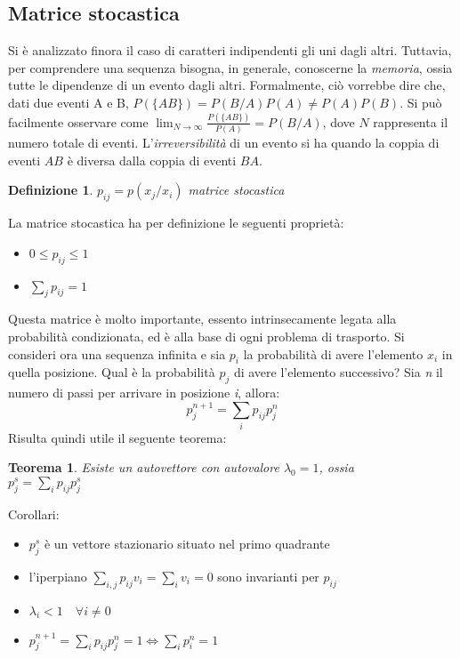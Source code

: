 \documentclass[12pt, a4paper]{book}
\theoremstyle{theorem}
\newtheorem{definition}{Definizione}[section]
\newtheorem{theorem}{Teorema}[section]
\begin{document}
			\subsection{Matrice stocastica}
				Si è analizzato finora il caso di caratteri indipendenti gli uni dagli altri.
				Tuttavia, per comprendere una sequenza bisogna, in generale, conoscerne la \textit{memoria}, ossia tutte le dipendenze di un evento dagli altri.
				Formalmente, ciò vorrebbe dire che, dati due eventi A e B, $P\left(\{AB\}\right)=P\left(B/A\right)P(A)\neq P(A)P(B)$.
				Si può facilmente osservare come $\lim_{N\to\infty}\frac{P\left(\{AB\}\right)}{P(A)}=P\left(B/A\right)$, dove $N$ rappresenta il numero totale di eventi.
				L'\textit{irreversibilità} di un evento si ha quando la coppia di eventi $AB$ è diversa dalla coppia di eventi $BA$.
				\begin{definition}
					$p_{ij}=p(x_j/x_i)$ matrice stocastica
				\end{definition}
				La matrice stocastica ha per definizione le seguenti proprietà:
				\begin{itemize}
					\item $0\leq p_{ij}\leq 1$
					\item $\sum_jp_{ij}=1$
				\end{itemize}
				Questa matrice è molto importante, essento intrinsecamente legata alla probabilità condizionata, ed è alla base di ogni problema di trasporto.
				Si consideri ora una sequenza infinita e sia $p_i$ la probabilità di avere l'elemento $x_i$ in quella posizione.
				Qual è la probabilità $p_j$ di avere l'elemento successivo?
				Sia \textit{n} il numero di passi per arrivare in posizione \textit{i}, allora:
				\begin{equation}
					p_j^{n+1}=\sum_ip_{ij}p_j^n
				\end{equation}
				Risulta quindi utile il seguente teorema:
				\begin{theorem}
					Esiste un autovettore con autovalore $\lambda_0=1$, ossia\\
					$p_j^s=\sum_ip_{ij}p_j^s$
				\end{theorem}
				Corollari:
				\begin{itemize}
					\item $p_j^s$ è un vettore stazionario situato nel primo quadrante
					\item l'iperpiano $\sum_{i,j}p_{ij}v_i=\sum_iv_i=0$ sono invarianti per $p_{ij}$
					\item $\lambda_i<1\quad\forall i\neq 0$
					\item $p_j^{n+1}=\sum_ip_{ij}p_j^n=1\Leftrightarrow\sum_ip_i^n=1$
				\end{itemize}
\end{document}
